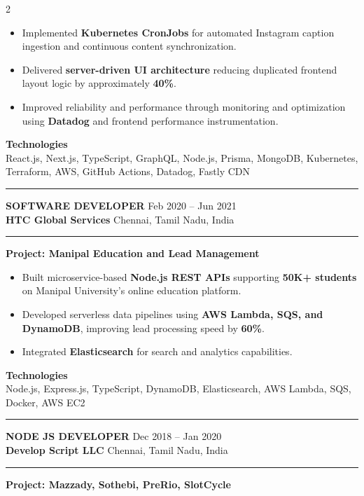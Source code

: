 \documentclass[10pt,a4paper]{article}
\newcommand{\blockdivider}{\vspace{0pt}\color{rulecolor}\rule{\linewidth}{0.5pt}\color{primary}\vspace{4pt}}
\newcommand{\roleheader}[4]{%
  \noindent
  \textbf{\MakeUppercase{#3}}%
  \hfill
  \textcolor{secondary}{#4}\\[0pt]

  \noindent
  \textbf{#1}%
  \hfill
  \textcolor{secondary}{#2}\\[0pt]
}
\newcommand{\roledivider}{%
  \vspace{-1pt}%
  {\color{rulecolor}\rule{\linewidth}{0.5pt}}%
  \vspace{2pt}%
}
\newcommand{\projecttitle}[1]{\textbf{#1}\par\vspace{2pt}}
\begin{document}
\begin{paracol}{2}
\begin{itemize}
\item Implemented \textbf{Kubernetes CronJobs} for automated Instagram caption ingestion and continuous content synchronization.

\item Delivered \textbf{server-driven UI architecture} reducing duplicated frontend layout logic by approximately \textbf{40\%}.

\item Improved reliability and performance through monitoring and optimization using \textbf{Datadog} and frontend performance instrumentation.

\end{itemize}

\textbf{Technologies}\\
React.js, Next.js, TypeScript, GraphQL, Node.js, Prisma, MongoDB, Kubernetes, Terraform, AWS, GitHub Actions, Datadog, Fastly CDN

\blockdivider

\roleheader{HTC Global Services}{Chennai, Tamil Nadu, India}{Software Developer}{Feb 2020 -- Jun 2021}
\roledivider

\projecttitle{Project: Manipal Education and Lead Management}
\begin{itemize}

\item Built microservice-based \textbf{Node.js REST APIs} supporting \textbf{50K+ students} on Manipal University's online education platform.

\item Developed serverless data pipelines using \textbf{AWS Lambda, SQS, and DynamoDB}, improving lead processing speed by \textbf{60\%}.

\item Integrated \textbf{Elasticsearch} for search and analytics capabilities.

\end{itemize}

\textbf{Technologies}\\
Node.js, Express.js, TypeScript, DynamoDB, Elasticsearch, AWS Lambda, SQS, Docker, AWS EC2

\blockdivider

\roleheader{Develop Script LLC}{Chennai, Tamil Nadu, India}{Node JS Developer}{Dec 2018 -- Jan 2020}
\roledivider

\projecttitle{Project: Mazzady, Sothebi, PreRio, SlotCycle}
\begin{itemize}


\end{itemize}
\end{paracol}
\end{document}
